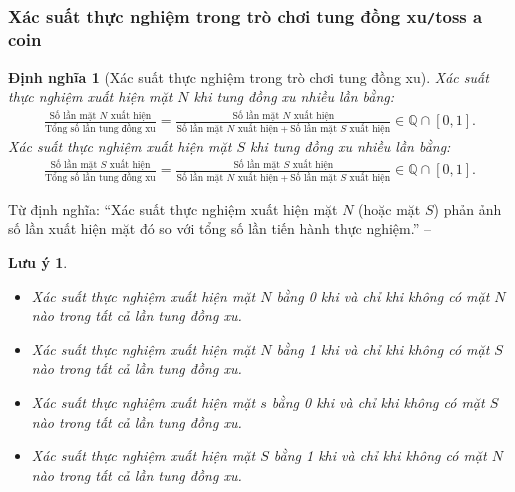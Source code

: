 \documentclass{article}
\numberwithin{equation}{section}
\newtheorem{definition}{Định nghĩa}[section]
\newtheorem{remark}{Lưu ý}[section]
\begin{document}
\subsubsection{Xác suất thực nghiệm trong trò chơi tung đồng xu\texttt{/}toss a coin}
\begin{definition}[Xác suất thực nghiệm trong trò chơi tung đồng xu]
	\emph{Xác suất thực nghiệm xuất hiện mặt $N$} khi tung đồng xu nhiều lần bằng:
	\begin{align*}
		\frac{\mbox{Số lần mặt $N$ xuất hiện}}{\mbox{Tổng số lần tung đồng xu}} = \frac{\mbox{Số lần mặt $N$ xuất hiện}}{\mbox{Số lần mặt $N$ xuất hiện} + \mbox{Số lần mặt $S$ xuất hiện}}\in\mathbb{Q}\cap[0,1].
	\end{align*}
	\emph{Xác suất thực nghiệm xuất hiện mặt $S$} khi tung đồng xu nhiều lần bằng:
	\begin{align*}
		\frac{\mbox{Số lần mặt $S$ xuất hiện}}{\mbox{Tổng số lần tung đồng xu}} = \frac{\mbox{Số lần mặt $S$ xuất hiện}}{\mbox{Số lần mặt $N$ xuất hiện} + \mbox{Số lần mặt $S$ xuất hiện}}\in\mathbb{Q}\cap[0,1].
	\end{align*}
\end{definition}
Từ định nghĩa: ``Xác suất thực nghiệm xuất hiện mặt $N$ (hoặc mặt $S$) phản ảnh số lần xuất hiện mặt đó so với tổng số lần tiến hành thực nghiệm.'' -- \cite[p. 18]{Thai_Anh_Dat_Ha_Loan_Nam_Quang_Toan_6_tap_2}

\begin{remark}
	\begin{itemize}
		\item Xác suất thực nghiệm xuất hiện mặt $N$ bằng 0 khi và chỉ khi không có mặt $N$ nào trong tất cả lần tung đồng xu.
		\item Xác suất thực nghiệm xuất hiện mặt $N$ bằng 1 khi và chỉ khi không có mặt $S$ nào trong tất cả lần tung đồng xu.
		\item Xác suất thực nghiệm xuất hiện mặt $s$ bằng 0 khi và chỉ khi không có mặt $S$ nào trong tất cả lần tung đồng xu.
		\item Xác suất thực nghiệm xuất hiện mặt $S$ bằng 1 khi và chỉ khi không có mặt $N$ nào trong tất cả lần tung đồng xu.
	\end{itemize}
\end{remark}
\end{document}
